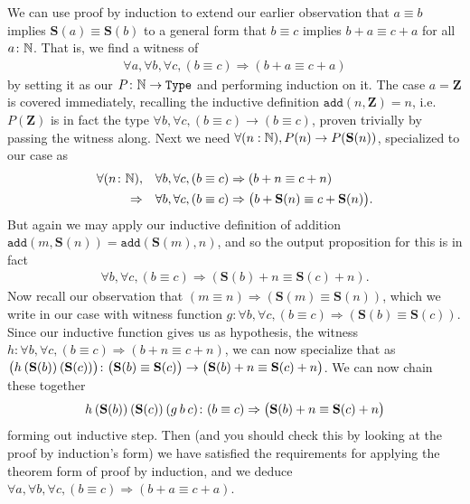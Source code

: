 \documentclass[11pt]{article}
\begin{document}
\begin{corollary}
We can use proof by induction to extend our earlier observation that $a \equiv b$ implies $\mathbf{S}(a) \equiv \mathbf{S}(b)$ to a general form that $b \equiv c$ implies $b + a \equiv c + a$ for all $a \colon \mathbb{N}$. That is, we find a witness of \begin{gather*}
\forall a, \forall b, \forall c, (b \equiv c) \Rightarrow (b + a \equiv c + a)
\end{gather*}
by setting it as our $P\colon \mathbb{N} \to \mathtt{Type}$ and performing induction on it. The case $a = \mathbf{Z}$ is covered immediately, recalling the inductive definition $\mathtt{add}(n, \mathbf{Z}) = n$, i.e. $P(\mathbf{Z})$ is in fact the type $\forall b, \forall c, (b \equiv c) \to (b \equiv c)$, proven trivially by passing the witness along. Next we need $\forall (n : \mathbb{N}), P(n) \to P(\mathbf{S}(n))$, specialized to our case as \begin{align*}
\forall (n \colon \mathbb{N}), \hspace{1em} &
\forall b, \forall c, (b \equiv c) \Rightarrow (b + n \equiv c + n) \\
\Rightarrow
\hspace{1em} & 
\forall b, \forall c, (b \equiv c) \Rightarrow \big(b + \mathbf{S}(n) \equiv c + \mathbf{S}(n) \big).
\end{align*}
But again we may apply our inductive definition of addition $\mathtt{add}(m, \mathbf{S}(n)) = \mathtt{add}(\mathbf{S}(m),n)$, and so the output proposition for this is in fact \begin{gather*}
\forall b, \forall c, (b \equiv c) \Rightarrow (\mathbf{S}(b) + n \equiv \mathbf{S}(c) + n).
\end{gather*}
Now recall our observation that $(m \equiv n) \Rightarrow (\mathbf{S}(m) \equiv \mathbf{S}(n))$, which we write in our case with witness function $g\colon \forall b, \forall c, (b \equiv c) \Rightarrow (\mathbf{S}(b) \equiv \mathbf{S}(c))$. Since our inductive function gives us as hypothesis, the witness $h \colon \forall b, \forall c, (b \equiv c) \Rightarrow (b + n \equiv c + n) $, we can now specialize that as $\big(h \hspace{0.2em} (\mathbf{S}(b)) \hspace{0.2em} (\mathbf{S}(c)) \big) \colon \big(\mathbf{S}(b) \equiv \mathbf{S}(c) \big) \rightarrow \big(\mathbf{S}(b) + n \equiv \mathbf{S}(c) + n \big)$. We can now chain these together \begin{gather*}
h \hspace{0.2em} (\mathbf{S}(b)) \hspace{0.2em} (\mathbf{S}(c)) \hspace{0.2em} (g \hspace{0.2em} b \hspace{0.2em} c) \colon (b \equiv c) \Rightarrow \big(\mathbf{S}(b) + n \equiv \mathbf{S}(c) + n \big)
\end{gather*}
forming out inductive step. Then (and you should check this by looking at the proof by induction's form) we have satisfied the requirements for applying the theorem form of proof by induction, and we deduce $\forall a, \forall b, \forall c, (b \equiv c) \Rightarrow (b + a \equiv c + a)$.


\end{corollary}
\end{document}
